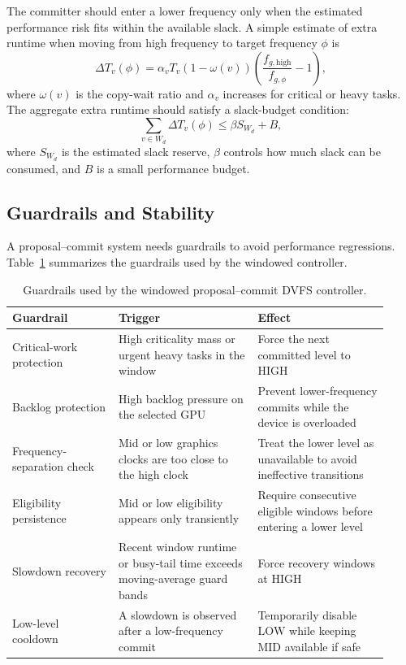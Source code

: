 The committer should enter a lower frequency only when the estimated performance risk fits within the available slack. A simple estimate of extra runtime when moving from high frequency to target frequency $\phi$ is
\begin{equation}
\Delta T_v(\phi) = \alpha_v T_v \left(1 - \omega(v)\right)
\left(\frac{f_{g,\mathrm{high}}}{f_{g,\phi}} - 1\right),
\label{eq:estimated_extra_runtime}
\end{equation}
where $\omega(v)$ is the copy-wait ratio and $\alpha_v$ increases for critical or heavy tasks. The aggregate extra runtime should satisfy a slack-budget condition:
\begin{equation}
\sum_{v \in W_d} \Delta T_v(\phi) \leq \beta S_{W_d} + B,
\label{eq:slack_budget_condition}
\end{equation}
where $S_{W_d}$ is the estimated slack reserve, $\beta$ controls how much slack can be consumed, and $B$ is a small performance budget.

\subsection{Guardrails and Stability}
\label{subsec:guardrails_stability}

A proposal--commit system needs guardrails to avoid performance regressions. Table~\ref{tab:dvfs_guardrails} summarizes the guardrails used by the windowed controller.
\begin{table}[t]
\centering
\footnotesize
\begin{tabular}{@{}p{0.26\linewidth}p{0.34\linewidth}p{0.32\linewidth}@{}}
\toprule
Guardrail & Trigger & Effect \\
\midrule
Critical-work protection & High criticality mass or urgent heavy tasks in the window & Force the next committed level to $\mathrm{HIGH}$ \\
Backlog protection & High backlog pressure on the selected GPU & Prevent lower-frequency commits while the device is overloaded \\
Frequency-separation check & Mid or low graphics clocks are too close to the high clock & Treat the lower level as unavailable to avoid ineffective transitions \\
Eligibility persistence & Mid or low eligibility appears only transiently & Require consecutive eligible windows before entering a lower level \\
Slowdown recovery & Recent window runtime or busy-tail time exceeds moving-average guard bands & Force recovery windows at $\mathrm{HIGH}$ \\
Low-level cooldown & A slowdown is observed after a low-frequency commit & Temporarily disable $\mathrm{LOW}$ while keeping $\mathrm{MID}$ available if safe \\
\bottomrule
\end{tabular}
\caption{Guardrails used by the windowed proposal--commit DVFS controller.}
\label{tab:dvfs_guardrails}
\end{table}

